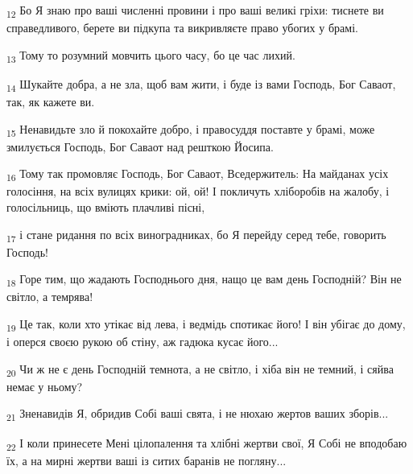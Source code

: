 \begin{tcolorbox}
\textsubscript{12} Бо Я знаю про ваші численні провини і про ваші великі гріхи: тиснете ви справедливого, берете ви підкупа та викривляєте право убогих у брамі.
\end{tcolorbox}
\begin{tcolorbox}
\textsubscript{13} Тому то розумний мовчить цього часу, бо це час лихий.
\end{tcolorbox}
\begin{tcolorbox}
\textsubscript{14} Шукайте добра, а не зла, щоб вам жити, і буде із вами Господь, Бог Саваот, так, як кажете ви.
\end{tcolorbox}
\begin{tcolorbox}
\textsubscript{15} Ненавидьте зло й покохайте добро, і правосуддя поставте у брамі, може змилується Господь, Бог Саваот над решткою Йосипа.
\end{tcolorbox}
\begin{tcolorbox}
\textsubscript{16} Тому так промовляє Господь, Бог Саваот, Вседержитель: На майданах усіх голосіння, на всіх вулицях крики: ой, ой! І покличуть хліборобів на жалобу, і голосільниць, що вміють плачливі пісні,
\end{tcolorbox}
\begin{tcolorbox}
\textsubscript{17} і стане ридання по всіх виноградниках, бо Я перейду серед тебе, говорить Господь!
\end{tcolorbox}
\begin{tcolorbox}
\textsubscript{18} Горе тим, що жадають Господнього дня, нащо це вам день Господній? Він не світло, а темрява!
\end{tcolorbox}
\begin{tcolorbox}
\textsubscript{19} Це так, коли хто утікає від лева, і ведмідь спотикає його! І він убігає до дому, і оперся своєю рукою об стіну, аж гадюка кусає його...
\end{tcolorbox}
\begin{tcolorbox}
\textsubscript{20} Чи ж не є день Господній темнота, а не світло, і хіба він не темний, і сяйва немає у ньому?
\end{tcolorbox}
\begin{tcolorbox}
\textsubscript{21} Зненавидів Я, обридив Собі ваші свята, і не нюхаю жертов ваших зборів...
\end{tcolorbox}
\begin{tcolorbox}
\textsubscript{22} І коли принесете Мені цілопалення та хлібні жертви свої, Я Собі не вподобаю їх, а на мирні жертви ваші із ситих баранів не погляну...
\end{tcolorbox}
